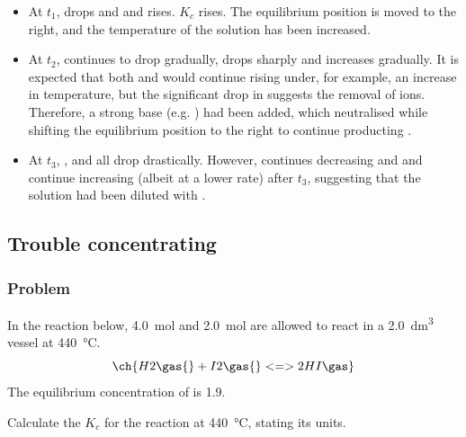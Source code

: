 \begin{itemize}
	\item At \(t_1\), \ch{[HOCl]} drops and \ch{[H^{+}]} and \ch{[OCl^-]} rises. \(K_c\)
	      rises. The equilibrium position is moved to the right, and {\color{accent} the
			      temperature of the solution has been increased}.
	\item At \(t_2\), \ch{[HOCl]} continues to drop gradually, \ch{[H^{+}]} drops sharply
	      and \ch{[OCl^-]} increases gradually. It is expected that both \ch{[H^{+}]} and \ch{[OCl]}
	      would continue rising under, for example, an increase in temperature, but
	      the significant drop in \ch{[H^{+}]} suggests the removal of  ions.
	      Therefore, {\color{accent} a strong base (e.g. ) had been added},
	      which neutralised  while shifting the equilibrium position to the right
	      to continue producting .
	\item At \(t_3\), \ch{[HOCl]}, \ch{[OCl^-]} and \ch{[H^{+}]} all drop drastically. However,
	      \ch{[HOCl]} continues decreasing and \ch{[H^{+}]} and \ch{[OCl^-]} continue increasing (albeit
	      at a lower rate) after \(t_3\), suggesting that {\color{accent} the solution had been
			      diluted with }.
\end{itemize}

\subsection{Trouble concentrating}
\subsubsection{Problem}

In the reaction below, \qty{4.0}{\mol}  and \qty{2.0}{\mol}  are allowed
to react in a \qty{2.0}{\dm\cubed} vessel at \qty{440}{\celsius}.
\begin{equation}
	\ch{H2 \gas{} + I2 \gas{} <=> 2 HI \gas}
\end{equation}
The equilibrium concentration of  is \qty{1.9}{\conc}.

Calculate the \(K_c\) for the reaction at
\qty{440}{\celsius}, stating its units.

